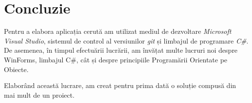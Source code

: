 \section*{Concluzie}

\par Pentru a elabora aplicația cerută am utilizat mediul de dezvoltare \textit{Microsoft Visual Studio}, sistemul de control al versiunilor \textit{git} și limbajul de programare \textit{C\#}. De asemenea, în timpul efectuării lucrării, am învățat multe lucruri noi despre WinForms, limbajul C\#, cât și despre principiile Programării Orientate pe Obiecte. 
\par Elaborând această lucrare, am creat pentru prima dată o soluție compusă din mai mult de un proiect.

\clearpage